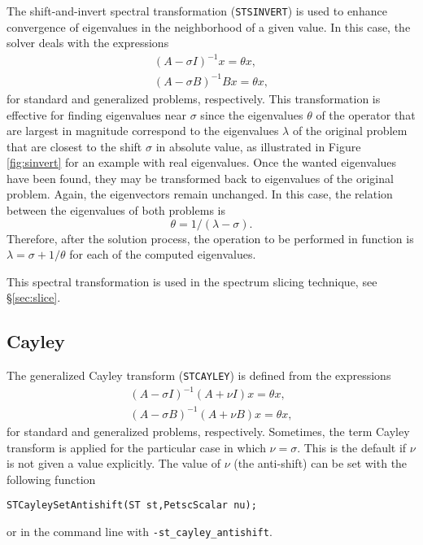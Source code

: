 	The shift-and-invert spectral transformation (\texttt{STSINVERT}) is used to enhance convergence of eigenvalues in the neighborhood of a given value. In this case, the solver deals with the expressions 
\begin{eqnarray}
(A-\sigma I)^{-1}x=\theta x,\\
(A-\sigma B)^{-1}B x=\theta x,
\end{eqnarray}
for standard and generalized problems, respectively. 
This transformation is effective for finding eigenvalues near $\sigma$ since the eigenvalues $\theta$ of the operator that are largest in magnitude correspond to the eigenvalues $\lambda$ of the original problem that are closest to the shift $\sigma$ in absolute value, as illustrated in Figure \ref{fig:sinvert} for an example with real eigenvalues. Once the wanted eigenvalues have been found, they may be transformed back to eigenvalues of the original problem. Again, the eigenvectors remain unchanged.
In this case, the relation between the eigenvalues of both problems is
\begin{equation}\theta=1/(\lambda-\sigma).\end{equation}
Therefore, after the solution process, the operation to be performed in function  is $\lambda=\sigma+1/\theta$ for each of the computed eigenvalues.

This spectral transformation is used in the spectrum slicing technique, see \S\ref{sec:slice}.

\subsection{Cayley}
\label{sec:cayley}

	The generalized Cayley transform (\texttt{STCAYLEY}) is defined from the expressions
\begin{eqnarray}
(A-\sigma I)^{-1}(A+\nu I)x=\theta x,\\
(A-\sigma B)^{-1}(A+\nu B)x=\theta x,
\end{eqnarray}
for standard and generalized problems, respectively. Sometimes, the term Cayley transform is applied for the particular case in which $\nu=\sigma$. This is the default if $\nu$ is not given a value explicitly. The value of $\nu$ (the anti-shift) can be set with the following function
	\begin{Verbatim}[fontsize=\small]
	STCayleySetAntishift(ST st,PetscScalar nu);
	\end{Verbatim}
or in the command line with \Verb!-st_cayley_antishift!.


